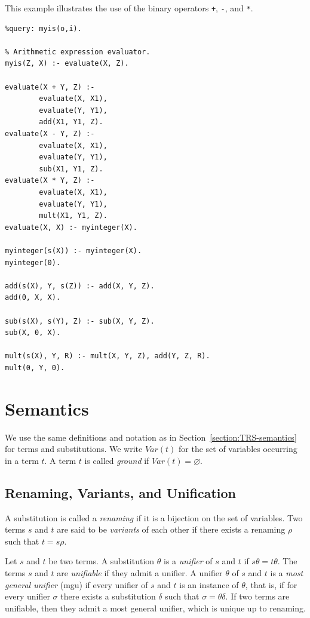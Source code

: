 \begin{example}\label{ex:lp-evaluate:syntax}
  This example illustrates the use of the binary operators
  \verb$+$, \verb+-+, and \verb+*+.
  \begin{verbatim}
%query: myis(o,i).

% Arithmetic expression evaluator.
myis(Z, X) :- evaluate(X, Z).

evaluate(X + Y, Z) :-
        evaluate(X, X1),
        evaluate(Y, Y1),
        add(X1, Y1, Z).
evaluate(X - Y, Z) :-
        evaluate(X, X1),
        evaluate(Y, Y1),
        sub(X1, Y1, Z).
evaluate(X * Y, Z) :-
        evaluate(X, X1),
        evaluate(Y, Y1),
        mult(X1, Y1, Z).
evaluate(X, X) :- myinteger(X).

myinteger(s(X)) :- myinteger(X).
myinteger(0).

add(s(X), Y, s(Z)) :- add(X, Y, Z).
add(0, X, X).

sub(s(X), s(Y), Z) :- sub(X, Y, Z).
sub(X, 0, X).

mult(s(X), Y, R) :- mult(X, Y, Z), add(Y, Z, R).
mult(0, Y, 0).
  \end{verbatim}
\end{example}

\section{Semantics}\label{section:LP-semantics}

We use the same definitions and notation as in Section~\ref{section:TRS-semantics}
for terms and substitutions.
We write $\mathit{Var}(t)$ for the set of variables occurring in a term $t$.
A term $t$ is called \emph{ground} if $\mathit{Var}(t) = \varnothing$.

\subsection{Renaming, Variants, and Unification}
A substitution is called a \emph{renaming} if it is a bijection on the set of variables.
Two terms $s$ and $t$ are said to be \emph{variants} of each other if there exists a
renaming $\rho$ such that $t = s\rho$.

Let $s$ and $t$ be two terms. A substitution $\theta$ is a \emph{unifier} of
$s$ and $t$ if $s\theta = t\theta$. The terms $s$ and $t$ are \emph{unifiable}
if they admit a unifier. A unifier $\theta$ of $s$ and $t$ is a
\emph{most general unifier} (mgu) if every unifier of $s$ and $t$ is an instance
of $\theta$, that is, if for every unifier $\sigma$ there exists a substitution
$\delta$ such that $\sigma = \theta\delta$.
If two terms are unifiable, then they admit a most general unifier,
which is unique up to renaming.

